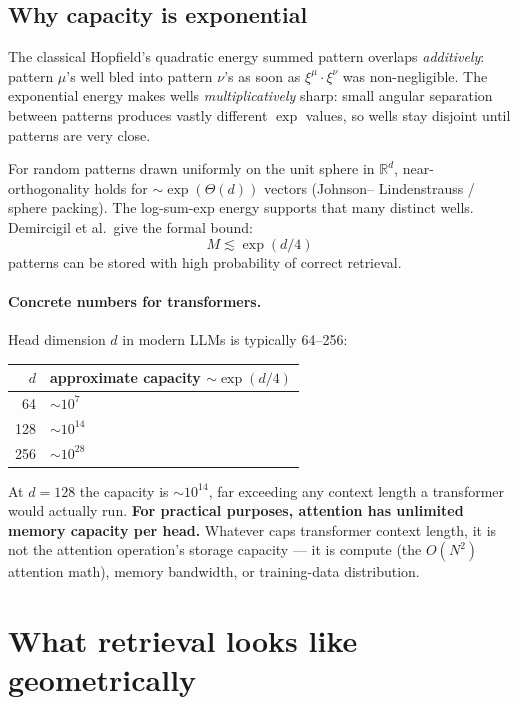 \documentclass[11pt,a4paper]{article}
\begin{document}
\subsection{Why capacity is exponential}

The classical Hopfield's quadratic energy summed pattern overlaps
\emph{additively}: pattern $\mu$'s well bled into pattern $\nu$'s as soon
as $\xi^\mu \cdot \xi^\nu$ was non-negligible. The exponential energy
makes wells \emph{multiplicatively} sharp: small angular separation
between patterns produces vastly different $\exp$ values, so wells stay
disjoint until patterns are very close.

For random patterns drawn uniformly on the unit sphere in $\mathbb{R}^d$,
near-orthogonality holds for $\sim \exp(\Theta(d))$ vectors (Johnson--%
Lindenstrauss / sphere packing). The log-sum-exp energy supports that
many distinct wells. Demircigil et al.~give the formal bound:
\[
M \lesssim \exp(d / 4)
\]
patterns can be stored with high probability of correct retrieval.

\paragraph{Concrete numbers for transformers.} Head dimension $d$ in
modern LLMs is typically 64--256:

\begin{center}
\begin{tabular}{rl}
\toprule
$d$ & approximate capacity $\sim \exp(d/4)$ \\
\midrule
64  & $\sim 10^{7}$  \\
128 & $\sim 10^{14}$ \\
256 & $\sim 10^{28}$ \\
\bottomrule
\end{tabular}
\end{center}

At $d=128$ the capacity is $\sim 10^{14}$, far exceeding any context
length a transformer would actually run. \textbf{For practical purposes,
attention has unlimited memory capacity per head.} Whatever caps
transformer context length, it is not the attention operation's storage
capacity --- it is compute (the $O(N^2)$ attention math), memory
bandwidth, or training-data distribution.

\section{What retrieval looks like geometrically}
\end{document}
